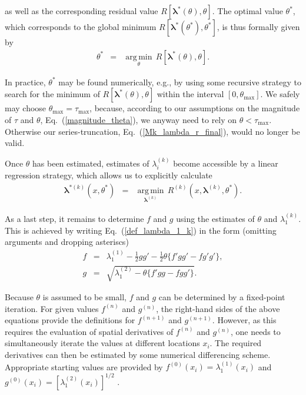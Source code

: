 \documentclass[aps,twocolumn,superscriptaddress,showpacs,showkeys]{revtex4}
\newcommand{\veclambda}{{\boldsymbol{\lambda}}}
\begin{document}
\noindent as well as the corresponding residual value $R[\veclambda^*(\theta),\theta]$. The optimal value $\theta^*$, which
corresponds to the global minimum $R[\veclambda^*(\theta^*),\theta^*]$, is thus formally given by
%
\begin{eqnarray}
\theta^* &=& \operatorname*{arg\,min}_{\theta}\,R[\veclambda^*(\theta),\theta].
\end{eqnarray}

\noindent In practice, $\theta^*$ may be found numerically, e.g., by using some recursive strategy to search for
the minimum of $R[\veclambda^*(\theta),\theta]$ within the interval $[0,\theta_\text{max}]$.
We safely may choose $\theta_\text{max}=\tau_\text{max}$, because,
according to our assumptions on the magnitude of $\tau$ and $\theta$, Eq.~(\ref{magnitude_theta}), we anyway
need to rely on $\theta<\tau_\text{max}$. Otherwise our series-truncation, Eq.~(\ref{Mk_lambda_r_final}),
would no longer be valid.

Once $\theta$ has been estimated, estimates of $\lambda^{(k)}_i$ become accessible by a linear regression strategy,
which allows us to explicitly calculate
%
\begin{eqnarray}
\veclambda^{*(k)}(x,\theta^*) &=& \operatorname*{arg\,min}_{\veclambda^{(k)}}\,R^{(k)}(x,\veclambda^{(k)},\theta^*).
\end{eqnarray}

\noindent As a last step, it remains to determine $f$ and $g$ using the estimates of $\theta$ and $\lambda^{(k)}_1$.
This is achieved by writing Eq.~(\ref{def_lambda_1_k}) in the form (omitting arguments and dropping asteriscs)
%
\begin{subequations}\label{fixed_point}
\begin{eqnarray}
f &=& \lambda^{(1)}_1 -\frac{1}{2}gg' -\frac{1}{2}\theta\big\{ f'gg' -fg'g' \big\},\\
g &=& \sqrt{\lambda^{(2)}_1 -\theta\big\{ f'gg-fgg' \big\}}.
\end{eqnarray}
\end{subequations}

\noindent Because $\theta$ is assumed to be small, $f$ and $g$ can be determined by a fixed-point iteration.
For given values $f^{(n)}$ and $g^{(n)}$, the right-hand sides of the above equations provide the definitions for
$f^{(n+1)}$ and $g^{(n+1)}$. However, as this requires the evaluation of spatial derivatives of $f^{(n)}$ and $g^{(n)}$,
one needs to simultaneously iterate the values at different locations $x_i$. The required derivatives can then be
estimated by some numerical differencing scheme. Appropriate starting values are provided by
$f^{(0)}(x_i)=\lambda^{(1)}_1(x_i)$ and
$g^{(0)}(x_i)=[\lambda^{(2)}_1(x_i)]^{1/2}$
. 
\end{document}
